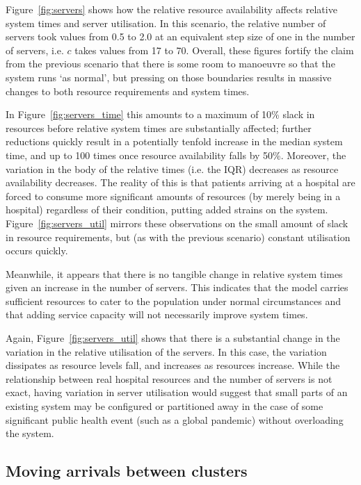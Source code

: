 Figure~\ref{fig:servers} shows how the relative resource availability affects
relative system times and server utilisation. In this scenario, the relative
number of servers took values from 0.5 to 2.0 at an equivalent step size of one
in the number of servers, i.e. \(c\) takes values from 17 to 70. Overall, these
figures fortify the claim from the previous scenario that there is some room to
manoeuvre so that the system runs `as normal', but pressing on those boundaries
results in massive changes to both resource requirements and system times.

In Figure~\ref{fig:servers_time} this amounts to a maximum of 10\% slack in
resources before relative system times are substantially affected; further
reductions quickly result in a potentially tenfold increase in the median system
time, and up to 100 times once resource availability falls by 50\%. Moreover,
the variation in the body of the relative times (i.e. the IQR) decreases as
resource availability decreases. The reality of this is that patients arriving
at a hospital are forced to consume more significant amounts of resources (by
merely being in a hospital) regardless of their condition, putting added strains
on the system. Figure~\ref{fig:servers_util} mirrors these observations on the
small amount of slack in resource requirements, but (as with the previous
scenario) constant utilisation occurs quickly.

Meanwhile, it appears that there is no tangible change in relative system times
given an increase in the number of servers. This indicates that the model
carries sufficient resources to cater to the population under normal
circumstances and that adding service capacity will not necessarily improve
system times.

Again, Figure~\ref{fig:servers_util} shows that there is a substantial change in
the variation in the relative utilisation of the servers. In this case, the
variation dissipates as resource levels fall, and increases as resources
increase. While the relationship between real hospital resources and the number
of servers is not exact, having variation in server utilisation would suggest
that small parts of an existing system may be configured or partitioned away in
the case of some significant public health event (such as a global pandemic)
without overloading the system.


\subsection{Moving arrivals between clusters}\label{subsec:moving}

